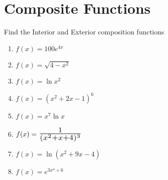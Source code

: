 \documentclass[14pt]{extarticle}
\newcommand*{\Scale}[2][1.5]{\scalebox{#1}{\ensuremath{#2}}}%
\begin{document}
\section{Composite Functions}
Find the Interior and Exterior composition functions
	\begin{enumerate}
		\item $f(x) = 100e^{4x}$
		\vspace{2.5cm}
		
		\item $f(x) = \sqrt{4-x^2}$
		\vspace{2.5cm}
		
		\item $ f(x) = \ln x^2$
		\vspace{2.5cm}
		
		\item $f(x) = (x^2+2x-1)^6$
		\vspace{2.5cm}
		
		\item $ f(x) = x^7\ln x$
		\vspace{2.5cm}
		
		\item $f(x) = \Scale[1.5]{\frac{1}{(x^2+x+4)^3}}$
		\vspace{2.5cm}
		
		\item $ f(x) = \ln(x^2+9x-4)$	
		\vspace{2.5cm}	
		
		\item $ f(x) = e^{3x^4+6}$
		\vspace{2.5cm}
	\end{enumerate}


\cleardoublepage
\end{document}
